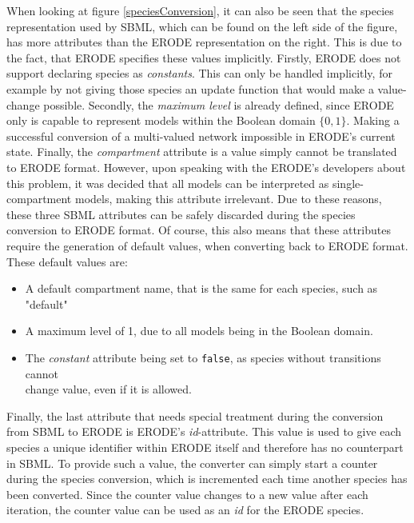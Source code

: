 When looking at figure \ref{speciesConversion}, it can also be seen that the species representation used by SBML, which can be found on the left side of the figure, has more attributes than the ERODE representation on the right. This is due to the fact, that ERODE specifies these values implicitly.
Firstly, ERODE does not support declaring species as \emph{constants}. This can only be handled implicitly, for example by not giving those species an update function that would make a value-change possible. Secondly, the \emph{maximum level} is already defined, since ERODE only is capable to represent models within the Boolean domain $\{0,1\}$. Making a successful conversion of a multi-valued network impossible in ERODE's current state. Finally, the \emph{compartment} attribute is a value simply cannot be translated to ERODE format. However, upon speaking with the ERODE's developers about this problem, it was decided that all models can be interpreted as single-compartment models, making this attribute irrelevant. Due to these reasons, these three SBML attributes can be safely discarded during the species conversion to ERODE format. Of course, this also means that these attributes require the generation of default values, when converting back to ERODE format. These default values are:
\begin{itemize}
    \item A default compartment name, that is the same for each species, such as "default"
    \item A maximum level of 1, due to all models being in the Boolean domain.
    \item The \emph{constant} attribute being set to \texttt{false}, as species without transitions cannot \\ change value, even if it is allowed.
\end{itemize}

Finally, the last attribute that needs special treatment during the conversion from SBML to ERODE is ERODE's \emph{id}-attribute. This value is used to give each species a unique identifier within ERODE itself and therefore has no counterpart in SBML. To provide such a value, the converter can simply start a counter during the species conversion, which is incremented each time another species has been converted. Since the counter value changes to a new value after each iteration, the counter value can be used as an \emph{id} for the ERODE species.




